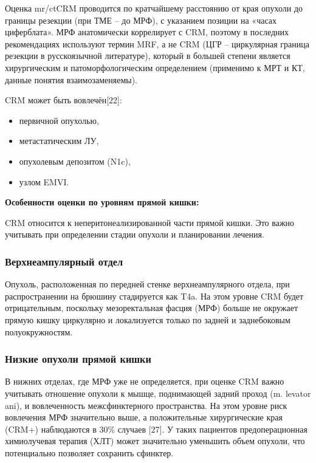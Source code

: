 \documentclass[
  russian,
  12pt,
  a4paper,
]{report}
\begin{document}
Оценка mr/ctCRM проводится по кратчайшему расстоянию от края опухоли до
границы резекции (при ТМЕ -- до МРФ), с указанием позиции на «часах
циферблата». МРФ анатомически коррелирует с CRM, поэтому в последних
рекомендациях используют термин MRF, а не CRM (ЦГР -- циркулярная
граница резекции в русскоязычной литературе), который в большей степени
является хирургическим и патоморфологическим определением (применимо к
МРТ и КТ, данные понятия взаимозаменяемы).

CRM может быть вовлечён{[}22{]}:

\begin{itemize}
\item
  первичной опухолью,
\item
  метастатическим ЛУ,
\item
  опухолевым депозитом (N1c),
\item
  узлом EMVI.
\end{itemize}

\textbf{Особенности оценки по уровням прямой кишки:}

CRM относится к неперитонеализированной части прямой кишки. Это важно
учитывать при определении стадии опухоли и планировании лечения.

\subsubsection{Верхнеампулярный
отдел}\label{ux432ux435ux440ux445ux43dux435ux430ux43cux43fux443ux43bux44fux440ux43dux44bux439-ux43eux442ux434ux435ux43b}

Опухоль, расположенная по передней стенке верхнеампулярного отдела, при
распространении на брюшину стадируется как T4a. На этом уровне CRM будет
отрицательным, поскольку мезоректальная фасция (МРФ) больше не окружает
прямую кишку циркулярно и локализуется только по задней и заднебоковым
полуокружностям.

\subsubsection{Низкие опухоли прямой
кишки}\label{ux43dux438ux437ux43aux438ux435-ux43eux43fux443ux445ux43eux43bux438-ux43fux440ux44fux43cux43eux439-ux43aux438ux448ux43aux438}

В нижних отделах, где МРФ уже не определяется, при оценке CRM важно
учитывать отношение опухоли к мышце, поднимающей задний проход (m.
levator ani), и вовлеченность межсфинктерного пространства. На этом
уровне риск вовлечения МРФ значительно выше, а положительные
хирургические края (CRM+) наблюдаются в 30\% случаев {[}27{]}. У таких
пациентов предоперационная химиолучевая терапия (ХЛТ) может значительно
уменьшить объем опухоли, что потенциально позволяет сохранить сфинктер.
\end{document}
